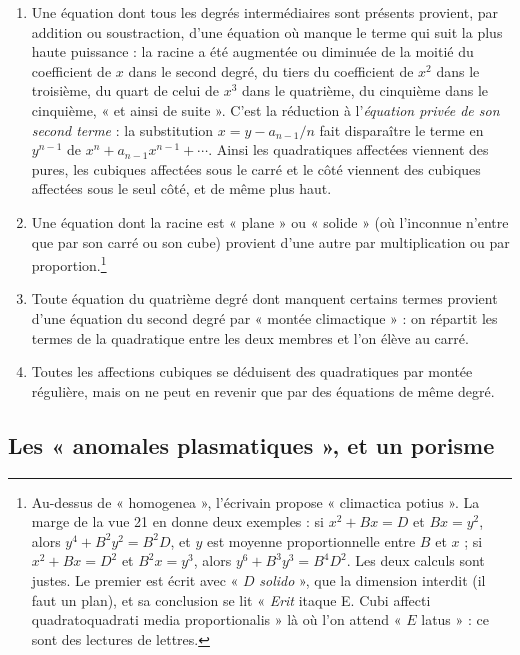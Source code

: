 \documentclass[11pt,a4paper]{article}
\begin{document}
\begin{enumerate}
  \item Une équation dont tous les degrés intermédiaires sont présents provient,
    par addition ou soustraction, d'une équation où manque le terme qui suit la
    plus haute puissance : la racine a été augmentée ou diminuée de la moitié du
    coefficient de $x$ dans le second degré, du tiers du coefficient de $x^2$
    dans le troisième, du quart de celui de $x^3$ dans le quatrième, du
    cinquième dans le cinquième, « et ainsi de suite ». C'est la réduction à
    l'\emph{équation privée de son second terme} : la substitution
    $x = y - a_{n-1}/n$ fait disparaître le terme en $y^{n-1}$ de
    $x^n + a_{n-1}x^{n-1} + \cdots$. Ainsi les quadratiques affectées viennent
    des pures, les cubiques affectées sous le carré et le côté viennent des
    cubiques affectées sous le seul côté, et de même plus haut.
  \item Une équation dont la racine est « plane » ou « solide » (où l'inconnue
    n'entre que par son carré ou son cube) provient d'une autre par
    multiplication ou par proportion.\footnote{Au-dessus de « homogenea »,
    l'écrivain propose « climactica potius ». La marge de la vue 21 en donne
    deux exemples : si $x^2 + Bx = D$ et $Bx = y^2$, alors $y^4 + B^2y^2 = B^2D$, et
    $y$ est moyenne proportionnelle entre $B$ et $x$ ; si $x^2 + Bx = D^2$ et
    $B^2x = y^3$, alors $y^6 + B^3y^3 = B^4D^2$. Les deux calculs sont justes. Le
    premier est écrit avec « $D$ \emph{solido} », que la dimension interdit (il
    faut un plan), et sa conclusion se lit « \emph{Erit} itaque E. Cubi affecti
    quadratoquadrati media proportionalis » là où l'on attend « $E$ latus » : ce
    sont des lectures de lettres.}
  \item Toute équation du quatrième degré dont manquent certains termes provient
    d'une équation du second degré par « montée climactique » : on répartit les
    termes de la quadratique entre les deux membres et l'on élève au carré.
  \item Toutes les affections cubiques se déduisent des quadratiques par montée
    régulière, mais on ne peut en revenir que par des équations de même degré.
\end{enumerate}

\subsection*{Les « anomales plasmatiques », et un porisme}
\end{document}

